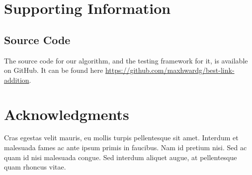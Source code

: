 \documentclass[10pt,letterpaper]{article}
\begin{document}
\section*{Supporting Information}

\subsection*{Source Code}
\label{S1_Video}
The source code for our algorithm, and the testing framework for it, is available on GitHub. It can be found here \url{https://github.com/maxhwardg/best-link-addition}.

\section*{Acknowledgments}
Cras egestas velit mauris, eu mollis turpis pellentesque sit amet. Interdum et malesuada fames ac ante ipsum primis in faucibus. Nam id pretium nisi. Sed ac quam id nisi malesuada congue. Sed interdum aliquet augue, at pellentesque quam rhoncus vitae.

\nolinenumbers

%
%
% 



\end{document}
